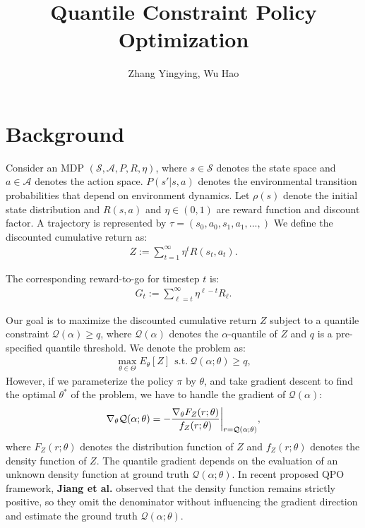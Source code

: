


\usepackage{amsmath}
\usepackage{xcolor}
\usepackage{float}
\usepackage{algorithm}
\usepackage{algorithmic}
\usepackage[fontset=ubuntu]{ctex}





\title{Quantile Constraint Policy Optimization}
\author{Zhang Yingying, Wu Hao}
\maketitle

\section{Background}
Consider an MDP $(\mathcal{S},\mathcal{A},P,R,\eta)$, where $s\in \mathcal{S}$ denotes the state space and $a \in \mathcal{A}$ denotes the action space. $P(s'|s,a)$ denotes the environmental transition probabilities that depend on environment dynamics. Let $\rho(s)$ denote the initial state distribution and $R(s,a)$ and $\eta \in (0,1)$ are reward function and discount factor. A trajectory is represented by $\tau=(s_0,a_0,s_1,a_1,...,)$ We define the discounted cumulative return as:
\begin{align}
    Z := \sum_{t=1}^{\infty} \eta^t R(s_t,a_t).
\end{align}

The corresponding reward-to-go for timestep $t$ is:
\begin{align}
    G_t := \sum_{\ell=t}^{\infty}\eta^{\ell-t}R_\ell.
\end{align}

Our goal is to maximize the discounted cumulative return $Z$ subject to a quantile constraint $\mathcal{Q}(\alpha) \geq q$, where $\mathcal{Q}(\alpha)$ denotes the $\alpha$-quantile of $Z$ and $q$ is a pre-specified quantile threshold. We denote the problem as:
\begin{align}
    \max_{\theta \in \Theta}E_{\theta}[Z] ~~\text{s.t.}~\mathcal{Q}(\alpha;\theta)\geq q,
\end{align}
However, if we parameterize the policy $\pi$ by $\theta$, and take gradient descent to find the optimal $\theta^*$ of the problem, we have to handle the gradient of $\mathcal{Q}(\alpha)$:
\begin{align}
    \nabla_\theta \mathcal{Q}(\alpha;\theta)
    = -\frac{\nabla_\theta F_Z(r;\theta)}{f_Z(r;\theta)}\bigg|_{r = \mathcal{Q}(\alpha;\theta)}, \notag
\end{align}
where $F_Z(r;\theta)$ denotes the distribution function of $Z$ and $f_Z(r;\theta)$ denotes the density function of $Z$. \textcolor{ECNURed}{The quantile gradient depends on the evaluation of an unknown density function at ground truth $\mathcal{Q}(\alpha;\theta)$}. In recent proposed QPO framework, \textbf{Jiang et al.} observed that the density function remains strictly positive, so they omit the denominator without influencing the gradient direction and estimate the ground truth $\mathcal{Q}(\alpha;\theta)$. 

